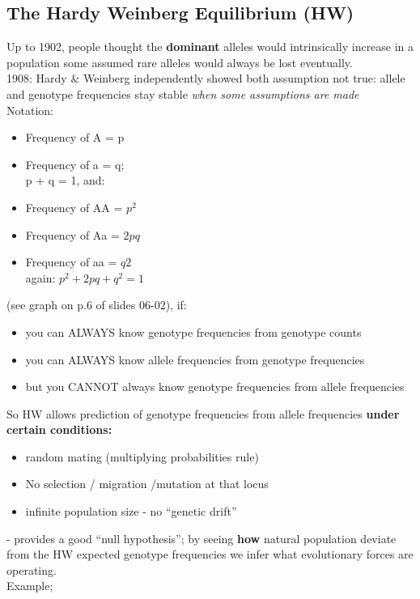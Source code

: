 \documentclass{scrartcl}
\begin{document}
\subsection{The Hardy Weinberg Equilibrium (HW)}
\label{sec:06-2}
Up to 1902, people thought the {\bf dominant} alleles would intrinsically increase in a population some assumed rare alleles would always be lost eventually.\\
1908: Hardy \& Weinberg independently showed both assumption not true: allele and genotype frequencies stay stable {\em when some assumptions are made}\\
Notation:
\begin{itemize}
\item Frequency of A = p
\item Frequency of a = q; \\
p + q = 1, and:
\item Frequency of AA = $p^2$
\item Frequency of Aa = $2pq$
\item Frequency of aa = $q2$\\
again: $p^2 + 2pq + q^2 = 1$
\end{itemize}
(see graph on p.6 of slides 06-02), if:
\begin{itemize}
\item you can ALWAYS know genotype frequencies from genotype counts
\item you can ALWAYS know allele frequencies from genotype frequencies
\item but you CANNOT always know genotype frequencies from allele frequencies 
\end{itemize}
So HW allows prediction of genotype frequencies from allele frequencies {\bf under certain conditions: }
\begin{itemize}
\item random mating (multiplying probabilities rule)
\item No selection / migration /mutation at that locus
\item infinite population size - no ``genetic drift''
\end{itemize}
- provides a good ``null hypothesis''; by seeing {\bf how } natural population deviate from the HW expected genotype frequencies we infer what evolutionary forces are operating.\\
Example;
\end{document}
